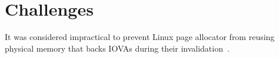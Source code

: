 \section{Challenges}

It was considered impractical to prevent Linux page allocator from reusing physical memory that backs IOVAs during their invalidation~\cite{Amit2011vIOMMU}.

